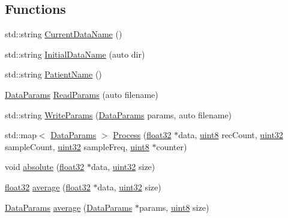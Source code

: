 \subsection*{Functions}
\begin{DoxyCompactItemize}
\item 
std\+::string \hyperlink{namespacevaso_abab641a332f2e834dfcdf294c0429426}{Current\+Data\+Name} ()
\item 
std\+::string \hyperlink{namespacevaso_af8f45524d4770053c2b812ce33a7095f}{Initial\+Data\+Name} (auto dir)
\item 
std\+::string \hyperlink{namespacevaso_a21e264fa912f7ca3f50e7e412ba1582e}{Patient\+Name} ()
\item 
\hyperlink{structDataParams}{Data\+Params} \hyperlink{namespacevaso_a6f1a23c617aae2e2c4af5e8016b4d03e}{Read\+Params} (auto filename)
\item 
std\+::string \hyperlink{namespacevaso_ad8543c0caabf3836b4a93a78e0d487d1}{Write\+Params} (\hyperlink{structDataParams}{Data\+Params} params, auto filename)
\item 
std\+::map$<$ \hyperlink{structDataParams}{Data\+Params} $>$ \hyperlink{namespacevaso_a36b6d07f6078968ee9fef13e8d48b151}{Process} (\hyperlink{definitions_8hpp_aacdc525d6f7bddb3ae95d5c311bd06a1}{float32} $\ast$data, \hyperlink{definitions_8hpp_adde6aaee8457bee49c2a92621fe22b79}{uint8} rec\+Count, \hyperlink{definitions_8hpp_a1134b580f8da4de94ca6b1de4d37975e}{uint32} sample\+Count, \hyperlink{definitions_8hpp_a1134b580f8da4de94ca6b1de4d37975e}{uint32} sample\+Freq, \hyperlink{definitions_8hpp_adde6aaee8457bee49c2a92621fe22b79}{uint8} $\ast$counter)
\item 
void \hyperlink{namespacevaso_a6ca90add966ce1773fc59a6883e6cd0c}{absolute} (\hyperlink{definitions_8hpp_aacdc525d6f7bddb3ae95d5c311bd06a1}{float32} $\ast$data, \hyperlink{definitions_8hpp_a1134b580f8da4de94ca6b1de4d37975e}{uint32} size)
\item 
\hyperlink{definitions_8hpp_aacdc525d6f7bddb3ae95d5c311bd06a1}{float32} \hyperlink{namespacevaso_ad3205136b1cd04b4c6b9d7be73661796}{average} (\hyperlink{definitions_8hpp_aacdc525d6f7bddb3ae95d5c311bd06a1}{float32} $\ast$data, \hyperlink{definitions_8hpp_a1134b580f8da4de94ca6b1de4d37975e}{uint32} size)
\item 
\hyperlink{structDataParams}{Data\+Params} \hyperlink{namespacevaso_a376413e791defec04a0faf329be1cbf4}{average} (\hyperlink{structDataParams}{Data\+Params} $\ast$params, \hyperlink{definitions_8hpp_adde6aaee8457bee49c2a92621fe22b79}{uint8} size)
\item 

\end{DoxyCompactItemize}
